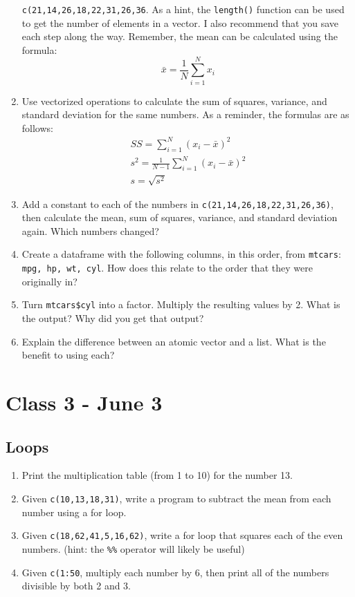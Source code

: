 \documentclass[letterpaper,12pt]{article}
\begin{document}
\begin{enumerate}
    \verb|c(21,14,26,18,22,31,26,36|. As a hint, the \verb|length()| function can be used to get the number of elements in a vector. I also recommend that you save each step along the way. Remember, the mean can be calculated using the formula:
    \begin{equation*}
        \bar{x} = \frac{1}{N}\sum_{i=1}^N x_i
    \end{equation*}
    \item Use vectorized operations to calculate the sum of squares, variance, and standard deviation for the same numbers. As a reminder, the formulas are as follows:
    \begin{gather*}
        SS = \sum_{i=1}^N (x_i - \bar{x})^2 \\
        s^2 = \frac{1}{N-1}\sum_{i=1}^N (x_i - \bar{x})^2 \\
        s = \sqrt{s^2}
    \end{gather*}
    \item Add a constant to each of the numbers in \verb|c(21,14,26,18,22,31,26,36)|, then calculate the mean, sum of squares, variance, and standard deviation again. Which numbers changed?
    \item Create a dataframe with the following columns, in this order, from \verb|mtcars|: \verb|mpg, hp, wt, cyl|. How does this relate to the order that they were originally in?
    \item Turn \verb|mtcars$cyl| into a factor. Multiply the resulting values by 2. What is the output? Why did you get that output?
    \item Explain the difference between an atomic vector and a list. What is the benefit to using each?
\end{enumerate}

\section{Class 3 - June 3}

\subsection{Loops}

\begin{enumerate}
    \item Print the multiplication table (from 1 to 10) for the number 13.
    \item Given \verb|c(10,13,18,31)|, write a program to subtract the mean from each number using a for loop. 
    \item Given \verb|c(18,62,41,5,16,62)|, write a for loop that squares each of the even numbers. (hint: the \verb|%%| operator will likely be useful)
    \item Given \verb|c(1:50|, multiply each number by 6, then print all of the numbers divisible by both 2 and 3.
\end{enumerate}
\end{document}
